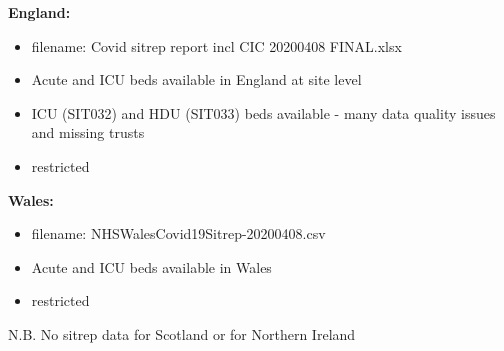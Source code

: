\documentclass[
]{article}
\providecommand{\tightlist}{%
  \setlength{\itemsep}{0pt}\setlength{\parskip}{0pt}}
\begin{document}
\textbf{England:}

\begin{itemize}
\tightlist
\item
  filename: Covid sitrep report incl CIC 20200408 FINAL.xlsx
\item
  Acute and ICU beds available in England at site level
\item
  ICU (SIT032) and HDU (SIT033) beds available - many data quality
  issues and missing trusts
\item
  restricted
\end{itemize}

\textbf{Wales:}

\begin{itemize}
\tightlist
\item
  filename: NHSWalesCovid19Sitrep-20200408.csv
\item
  Acute and ICU beds available in Wales
\item
  restricted
\end{itemize}

N.B. No sitrep data for Scotland or for Northern Ireland
\end{document}

